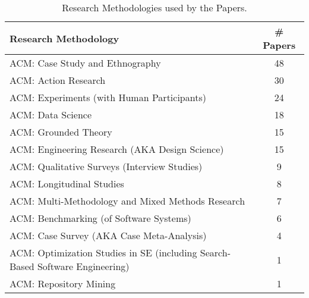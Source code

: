 \begin{table}[ht]
    \footnotesize
    \centering
    \caption{Research Methodologies used by the Papers.}
    \begin{tabular}{@{}l c@{}}
        \toprule
        \textbf{Research Methodology} & \textbf{\# Papers} \\
        \midrule
		ACM: Case Study and Ethnography & 48 \\
		ACM: Action Research & 30 \\
		ACM: Experiments (with Human Participants) & 24 \\
		ACM: Data Science & 18 \\
		ACM: Grounded Theory & 15 \\
		ACM: Engineering Research (AKA Design Science) & 15 \\
		ACM: Qualitative Surveys (Interview Studies) & 9 \\
		ACM: Longitudinal Studies & 8 \\
		ACM: Multi-Methodology and Mixed Methods Research & 7 \\
		ACM: Benchmarking (of Software Systems) & 6 \\
		ACM: Case Survey (AKA Case Meta-Analysis) & 4 \\
		ACM: Optimization Studies in SE (including Search-Based Software Engineering) & 1 \\
		ACM: Repository Mining & 1 \\
	\bottomrule
    \end{tabular}
    \label{tab:methodologies}
\end{table}